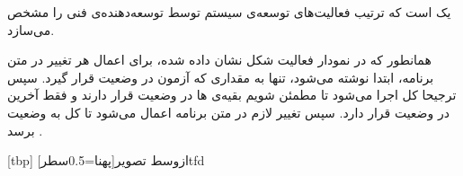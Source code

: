 
 یک  است که ترتیب فعالیت‌های توسعه‌ی سیستم
توسط توسعه‌دهنده‌ی فنی را مشخص می‌سازد.

همانطور که در نمودار فعالیت شکل  نشان داده شده، برای
اعمال هر تغییر در متن برنامه، ابتدا  نوشته می‌شود، تنها به
مقداری که آزمون در وضعیت  قرار گیرد. سپس ترجیحا کل
 اجرا می‌شود تا مطمئن شویم بقیه‌ی ‌ها در وضعیت
 قرار دارند و فقط آخرین  در وضعیت  قرار
دارد. سپس تغییر لازم در متن برنامه اعمال می‌شود تا کل 
به وضعیت  برسد .

[tbp]
  ‌ازوسط
  ‌تصویر[پهنا=0.5‌سطر]{tfd}

